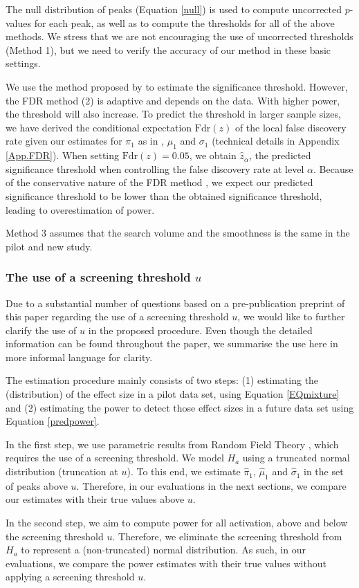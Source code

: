 The null distribution of peaks (Equation \ref{null}) is used to compute uncorrected $p$-values for each peak, as well as to compute the thresholds for all of the above methods.  We stress that we are not encouraging the use of uncorrected thresholds (Method 1), but we need to verify the accuracy of our method in these basic settings.
{\color{Cyan}
We use the method proposed by \citet{Benjamini1995} to estimate the significance threshold.  However, the FDR method (2) is adaptive and depends on the data.  With higher power, the threshold will also increase.  To predict the threshold in larger sample sizes, we have derived the conditional expectation $\text{Fdr}(z)$ of the local false discovery rate given our estimates for $\pi_1$ as in \citet{efron2007}, $\mu_1$ and $\sigma_1$ (technical details in Appendix \ref{App.FDR}).  When setting $\text{Fdr}(z)=0.05$, we obtain $\hat z_\alpha$, the predicted significance threshold when controlling the false discovery rate at level $\alpha$.  Because of the conservative nature of the FDR method \citep{Benjamini1995}, we expect our predicted significance threshold to be lower than the obtained significance threshold, leading to overestimation of power.

}

Method 3 assumes that the search volume and the smoothness is the same in the pilot and new study.

{\color{Cyan}
\subsubsection{The use of a screening threshold $u$ \label{screening}}
Due to a substantial number of questions based on a pre-publication preprint of this paper \citep{PREPRINT} regarding the use of a screening threshold $u$, we would like to further clarify the use of $u$ in the proposed procedure.  Even though the detailed information can be found throughout the paper, we summarise the use here in more informal language for clarity.

The estimation procedure mainly consists of two steps: (1) estimating the (distribution) of the effect size in a pilot data set, using Equation \ref{EQmixture} and (2) estimating the power to detect those effect sizes in a future data set using Equation \ref{predpower}.

In the first step, we use parametric results from Random Field Theory \citep{Worsley2007}, which requires the use of a screening threshold.  We model $H_a$ using a truncated normal distribution (truncation at $u$).  To this end, we estimate $\hat\pi_1$,  $\hat\mu_1$ and $\hat\sigma_1$ in the set of peaks above $u$.  Therefore, in our evaluations in the next sections, we compare our estimates with their true values above $u$.

In the second step, we aim to compute power for all activation, above and below the screening threshold $u$.  Therefore, we eliminate the screening threshold from $H_a$ to represent a (non-truncated) normal distribution.  As such, in our evaluations, we compare the power estimates with their true values without applying a screening threshold $u$.
}
